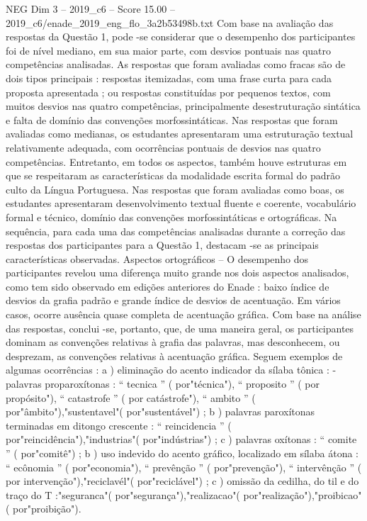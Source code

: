 \begin{textsample}{NEG Dim 3 – 2019\_c6 – Score 15.00 – 2019\_c6/enade\_2019\_eng\_flo\_3a2b53498b.txt}
Com base na avaliação das respostas da Questão 1, pode -se considerar que o desempenho dos participantes foi de nível mediano, em sua maior parte, com desvios pontuais nas quatro competências analisadas.
As respostas que foram avaliadas como fracas são de dois tipos principais : respostas itemizadas, com uma frase curta para cada proposta apresentada ; ou respostas constituídas por pequenos textos, com muitos desvios nas quatro competências, principalmente desestruturação sintática e falta de domínio das convenções morfossintáticas.
Nas respostas que foram avaliadas como medianas, os estudantes apresentaram uma estruturação textual relativamente adequada, com ocorrências pontuais de desvios nas quatro competências.
Entretanto, em todos os aspectos, também houve estruturas em que se respeitaram as características da modalidade escrita formal do padrão culto da Língua Portuguesa.
Nas respostas que foram avaliadas como boas, os estudantes apresentaram desenvolvimento textual fluente e coerente, vocabulário formal e técnico, domínio das convenções morfossintáticas e ortográficas.
Na sequência, para cada uma das competências analisadas durante a correção das respostas dos participantes para a Questão 1, destacam -se as principais características observadas.
Aspectos ortográficos – O desempenho dos participantes revelou uma diferença muito grande nos dois aspectos analisados, como tem sido observado em edições anteriores do Enade : baixo índice de desvios da grafia padrão e grande índice de desvios de acentuação.
Em vários casos, ocorre ausência quase completa de acentuação gráfica.
Com base na análise das respostas, conclui -se, portanto, que, de uma maneira geral, os participantes dominam as convenções relativas à grafia das palavras, mas desconhecem, ou desprezam, as convenções relativas à acentuação gráfica.
Seguem exemplos de algumas ocorrências : a ) eliminação do acento indicador da sílaba tônica : - palavras proparoxítonas : “ tecnica ” ( por"técnica"), “ proposito ” ( por propósito"), “ catastrofe ” ( por catástrofe"), “ ambito ” ( por"âmbito"),"sustentavel"( por"sustentável") ; b ) palavras paroxítonas terminadas em ditongo crescente : “ reincidencia ” ( por"reincidência"),"industrias"( por"indústrias") ; c ) palavras oxítonas : “ comite ” ( por"comitê") ; b ) uso indevido do acento gráfico, localizado em sílaba átona : “ ecônomia ” ( por"economia"), “ prevênção ” ( por"prevenção"), “ intervênção ” ( por intervenção"),"reciclavél"( por"reciclável") ; c ) omissão da cedilha, do til e do traço do T :"seguranca"( por"segurança"),"realizacao"( por"realização"),"proibicao"( por"proibição").

\end{textsample}
